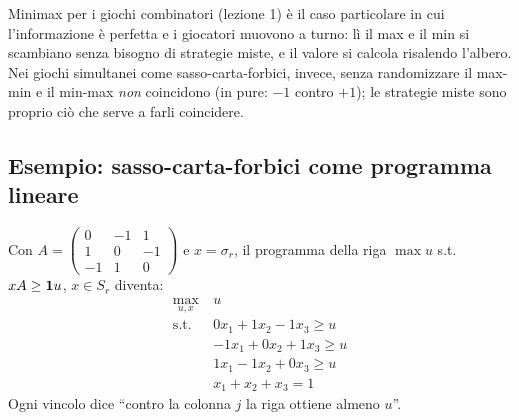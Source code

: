 \begin{extra}
Minimax per i giochi combinatori (lezione 1) è il caso particolare in cui l'informazione
è perfetta e i giocatori muovono a turno: lì il max e il min si scambiano senza bisogno di
strategie miste, e il valore si calcola risalendo l'albero. Nei giochi simultanei come
sasso-carta-forbici, invece, senza randomizzare il max-min e il min-max \emph{non}
coincidono (in pure: $-1$ contro $+1$); le strategie miste sono proprio ciò che serve a
farli coincidere.
\end{extra}

\subsection{Esempio: sasso-carta-forbici come programma lineare}

Con $A = \begin{pmatrix} 0&-1&1\\ 1&0&-1\\ -1&1&0 \end{pmatrix}$ e $x = \sigma_r$, il
programma della riga $\max u$ s.t.\ $xA \ge \mathbf{1} u$, $x \in S_r$ diventa:
\[
\begin{aligned}
  \max_{u,x}\ & u\\
  \text{s.t. }\ & 0x_1 + 1x_2 - 1x_3 \ge u\\
  & -1x_1 + 0x_2 + 1x_3 \ge u\\
  & 1x_1 - 1x_2 + 0x_3 \ge u\\
  & x_1 + x_2 + x_3 = 1
\end{aligned}
\]
Ogni vincolo dice ``contro la colonna $j$ la riga ottiene almeno $u$''.

